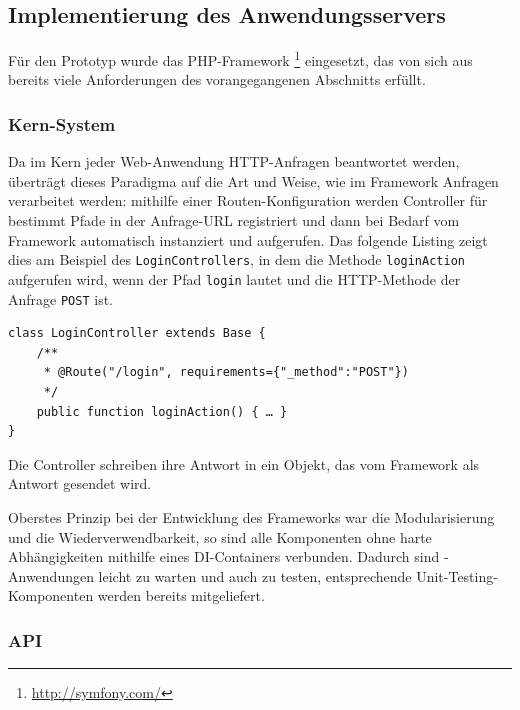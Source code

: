 \pagebreak

\subsection{Implementierung des Anwendungsservers}\label{l:implementierung-server}

Für den Prototyp wurde das PHP-Framework \footnote{\url{http://symfony.com/}} eingesetzt, das von sich aus bereits viele Anforderungen des vorangegangenen Abschnitts erfüllt. 

\subsubsection{Kern-System}

Da im Kern jeder Web-Anwendung HTTP-Anfragen beantwortet werden, überträgt  dieses Paradigma auf die Art und Weise, wie im Framework Anfragen verarbeitet werden: mithilfe einer Routen-Konfiguration werden Controller für bestimmt Pfade in der Anfrage-URL registriert und dann bei Bedarf vom Framework automatisch instanziert und aufgerufen. Das folgende Listing zeigt dies am Beispiel des \texttt{LoginControllers}, in dem die Methode \texttt{loginAction} aufgerufen wird, wenn der Pfad \texttt{\/login} lautet und die HTTP-Methode der Anfrage \texttt{POST} ist.

\begin{samepage}
\begin{verbatim}
class LoginController extends Base {
    /**
     * @Route("/login", requirements={"_method":"POST"})
     */
    public function loginAction() { … }
}
\end{verbatim}
\end{samepage}

Die Controller schreiben ihre Antwort in ein Objekt, das vom Framework als Antwort gesendet wird. 

Oberstes Prinzip bei der Entwicklung des Frameworks war die Modularisierung und die Wiederverwendbarkeit, so sind alle Komponenten ohne harte Abhängigkeiten mithilfe eines DI-Containers verbunden. Dadurch sind -Anwendungen leicht zu warten und auch zu testen, entsprechende Unit-Testing-Komponenten werden bereits mitgeliefert.

\subsubsection{API}\label{l:api-implementierung}

